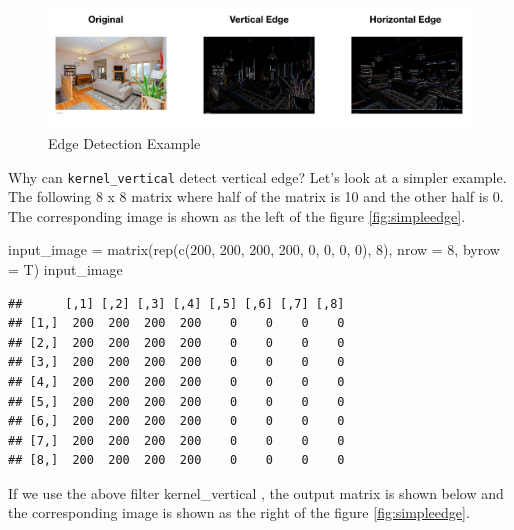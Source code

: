 \documentclass[
  12pt,
]{krantz}
\makeatletter
\newenvironment{Shaded}{\begin{snugshade}}{\end{snugshade}}
\newcommand{\AttributeTok}[1]{\textcolor[rgb]{0.61,0.61,0.61}{#1}}
\newcommand{\DecValTok}[1]{\textcolor[rgb]{0.06,0.06,0.06}{#1}}
\newcommand{\FunctionTok}[1]{\textcolor[rgb]{0,0,0}{#1}}
\newcommand{\NormalTok}[1]{#1}
\newcommand{\OtherTok}[1]{\textcolor[rgb]{0.37,0.37,0.37}{#1}}
\newenvironment{kframe}{%
\medskip{}
\setlength{\fboxsep}{.8em}
 \def\at@end@of@kframe{}%
 \ifinner\ifhmode%
  \def\at@end@of@kframe{\end{minipage}}%
  \begin{minipage}{\columnwidth}%
 \fi\fi%
 \def\FrameCommand##1{\hskip\@totalleftmargin \hskip-\fboxsep
 \colorbox{shadecolor}{##1}\hskip-\fboxsep
     \hskip-\linewidth \hskip-\@totalleftmargin \hskip\columnwidth}%
 \MakeFramed {\advance\hsize-\width
   \@totalleftmargin\z@ \linewidth\hsize
   \@setminipage}}%
 {\par\unskip\endMakeFramed%
 \at@end@of@kframe}
\renewenvironment{Shaded}{\begin{kframe}}{\end{kframe}}
\makeatother
\begin{document}
\begin{figure}

{\centering \includegraphics[width=1\linewidth]{images/edgedet5} 

}

\caption{Edge Detection Example}\label{fig:edgedetection}
\end{figure}

Why can \texttt{kernel\_vertical} detect vertical edge? Let's look at a simpler example. The following 8 x 8 matrix where half of the matrix is 10 and the other half is 0. The corresponding image is shown as the left of the figure \ref{fig:simpleedge}.

\begin{Shaded}
\begin{Highlighting}[]
\NormalTok{input\_image }\OtherTok{=} \FunctionTok{matrix}\NormalTok{(}\FunctionTok{rep}\NormalTok{(}\FunctionTok{c}\NormalTok{(}\DecValTok{200}\NormalTok{, }\DecValTok{200}\NormalTok{, }\DecValTok{200}\NormalTok{, }\DecValTok{200}\NormalTok{, }\DecValTok{0}\NormalTok{, }\DecValTok{0}\NormalTok{, }\DecValTok{0}\NormalTok{, }\DecValTok{0}\NormalTok{), }\DecValTok{8}\NormalTok{), }
                     \AttributeTok{nrow =} \DecValTok{8}\NormalTok{, }\AttributeTok{byrow =}\NormalTok{ T)}
\NormalTok{input\_image}
\end{Highlighting}
\end{Shaded}

\begin{verbatim}
##      [,1] [,2] [,3] [,4] [,5] [,6] [,7] [,8]
## [1,]  200  200  200  200    0    0    0    0
## [2,]  200  200  200  200    0    0    0    0
## [3,]  200  200  200  200    0    0    0    0
## [4,]  200  200  200  200    0    0    0    0
## [5,]  200  200  200  200    0    0    0    0
## [6,]  200  200  200  200    0    0    0    0
## [7,]  200  200  200  200    0    0    0    0
## [8,]  200  200  200  200    0    0    0    0
\end{verbatim}

If we use the above filter kernel\_vertical , the output matrix is shown below and the corresponding image is shown as the right of the figure \ref{fig:simpleedge}.
\end{document}
